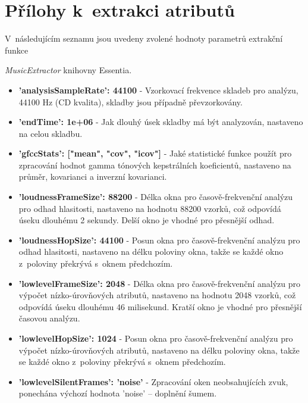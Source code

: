 

\chapter{Přílohy k~extrakci atributů}
\label{prilohy_k_extrakci_atributu}

V~následujícím seznamu jsou uvedeny zvolené hodnoty parametrů extrakční funkce

\noindent \textit{MusicExtractor} knihovny Essentia.

\begin{itemize}
    \item \textbf{'analysisSampleRate': 44100} - Vzorkovací frekvence skladeb pro analýzu, 44100 Hz (CD kvalita), skladby jsou případně převzorkovány.
    \item \textbf{'endTime': 1e+06} - Jak dlouhý úsek skladby má být analyzován, nastaveno na celou skladbu.
    \item \textbf{'gfccStats': ["mean", "cov", "icov"]} - Jaké statistické funkce použít pro zpracování hodnot gamma tónových kepstrálních koeficientů, nastaveno na průměr, kovarianci a inverzní kovarianci.
    \item \textbf{'loudnessFrameSize': 88200} - Délka okna pro časově-frekvenční analýzu pro odhad hlasitosti, nastaveno na hodnotu 88200 vzorků, což odpovídá úseku dlouhému 2 sekundy. Delší okno je vhodné pro přesnější odhad.
    \item \textbf{'loudnessHopSize': 44100} - Posun okna pro časově-frekvenční analýzu pro odhad hlasitosti, nastaveno na délku poloviny okna, takže se každé okno z~poloviny překrývá s~oknem předchozím.
    \item \textbf{'lowlevelFrameSize': 2048} - Délka okna pro časově-frekvenční analýzu pro výpočet nízko-úrovňových atributů, nastaveno na hodnotu 2048 vzorků, což odpovídá úseku dlouhému 46 milisekund. Kratší okno je vhodné pro přesnější časovou analýzu.
    \item \textbf{'lowlevelHopSize': 1024} - Posun okna pro časově-frekvenční analýzu pro výpočet nízko-úrovňových atributů, nastaveno na délku poloviny okna, takže se každé okno z~poloviny překrývá s~oknem předchozím.
    \item \textbf{'lowlevelSilentFrames': 'noise'} - Zpracování oken neobsahujících zvuk, ponechána výchozí hodnota 'noise' -- doplnění šumem.

\end{itemize}
